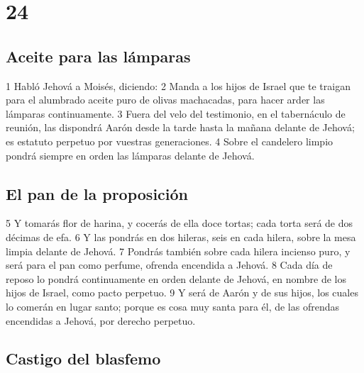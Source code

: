 \chapter{24}

\section{Aceite para las lámparas}

1 Habló Jehová a Moisés, diciendo:
2 Manda a los hijos de Israel que te traigan para el alumbrado aceite puro de olivas machacadas, para hacer arder las lámparas continuamente.
3 Fuera del velo del testimonio, en el tabernáculo de reunión, las dispondrá Aarón desde la tarde hasta la mañana delante de Jehová; es estatuto perpetuo por vuestras generaciones.
4 Sobre el candelero limpio pondrá siempre en orden las lámparas delante de Jehová.  

\section{El pan de la proposición}

5 Y tomarás flor de harina, y cocerás de ella doce tortas; cada torta será de dos décimas de efa.
6 Y las pondrás en dos hileras, seis en cada hilera, sobre la mesa limpia delante de Jehová.
7 Pondrás también sobre cada hilera incienso puro, y será para el pan como perfume, ofrenda encendida a Jehová.
8 Cada día de reposo lo pondrá continuamente en orden delante de Jehová, en nombre de los hijos de Israel, como pacto perpetuo.
9 Y será de Aarón y de sus hijos, los cuales lo comerán en lugar santo; porque es cosa muy santa para él, de las ofrendas encendidas a Jehová, por derecho perpetuo.  

\section{Castigo del blasfemo}

